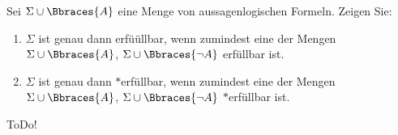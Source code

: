 
\begin{exercise}[25]

Sei $\Sigma \cup \Bbraces{A}$ eine Menge von aussagenlogischen Formeln.
Zeigen Sie:

\begin{enumerate}
    \item $\Sigma$ ist genau dann erfüüllbar, wenn zumindest eine der Mengen $\Sigma \cup \Bbraces{A}$, $\Sigma \cup \Bbraces{\neg A}$ erfüllbar ist.
    \item $\Sigma$ ist genau dann $\ast$erfüllbar, wenn zumindest eine der Mengen $\Sigma \cup \Bbraces{A}$, $\Sigma \cup \Bbraces{\neg A}$ $\ast$erfüllbar ist.
\end{enumerate}

\end{exercise}


\begin{solution}

ToDo!

\end{solution}

